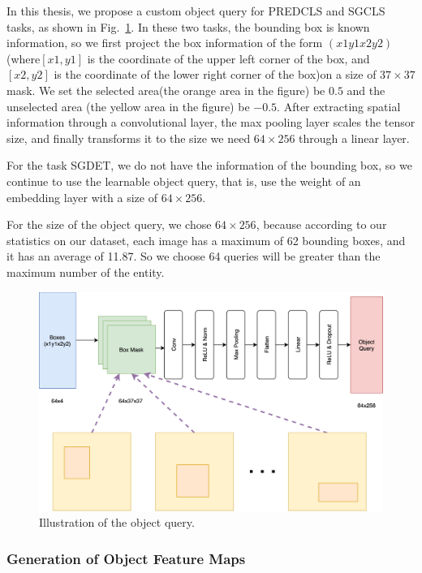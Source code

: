 In this thesis, we propose a custom object query for PREDCLS and SGCLS tasks, as shown in Fig.~\ref{fig:objectquery}. In these two tasks, the bounding box is known information, so we first project the box information of the form $ (x1y1x2y2)  $(where$ [x1,y1] $ is the coordinate of the upper left corner of the box, and $ [x2,y2] $ is the coordinate of the lower right corner of the box)on a size of $ 37 \times 37 $ mask. We set the selected area(the orange area in the figure) be $ 0.5  $ and the unselected area (the yellow area in the figure) be $ -0.5 $. After extracting spatial information through a convolutional layer, the max pooling layer scales the tensor size, and finally transforms it to the size we need $ 64 \times 256 $ through a linear layer.

For the task SGDET, we do not have the information of the bounding box, so we continue to use the learnable object query, that is, use the weight of an embedding layer with a size of $ 64 \times 256 $.

For the size of the object query, we chose $ 64 \times 256 $, because according to our statistics on our dataset, each image has a maximum of 62 bounding boxes, and it has an average of 11.87. So we choose 64 queries will be greater than the maximum number of the entity. 

\begin{figure}[tbph!]
	\centering
	\includegraphics[width=0.8\linewidth]{figures/object_query}
	\caption[Illustration of the object query]{Illustration of the object query.}
	\label{fig:objectquery}
\end{figure}


\subsubsection{Generation of Object Feature Maps }


